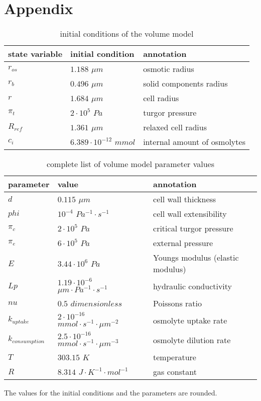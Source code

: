\section{Appendix}
\begin{table} [h]
	\footnotesize
	\begin{center} 
		\caption{initial conditions of the volume model}
		\begin{tabular} {l l l}
		\toprule
	 	\textbf{state variable} & \textbf{initial condition} & \textbf{annotation}  \\
	 	\midrule
	 	$r_{os}$ & $1.188$ $\mu m$ & osmotic radius\\
	 	$r_{b}$ & $0.496$ $\mu m$ &solid components radius\\
	 	$r$ & $1.684$ $\mu m$ & cell radius\\
	 	$\pi_t$ & $2 \cdot 10^5$ $Pa$ & turgor pressure\\
	 	$R_{ref}$ & $1.361$ $\mu m$ & relaxed cell radius \\
	 	$c_{i}$ & $6.389 \cdot 10^{-12}$ $mmol$ & internal amount of osmolytes\\
	 	\bottomrule
		\end{tabular}
		\label{initCondVolume}
	\end{center}
\end{table}

\begin{table} [h]
	\footnotesize
	\begin{center} 
		\caption{complete list of volume model parameter values}
		\begin{tabular} {l l l}
			\toprule
			\textbf{parameter} & \textbf{value} & \textbf{annotation}  \\
			\midrule
			$d$ & $0.115$ $\mu m$ & cell wall thickness\\
			$phi$ & $10^{-4}$ $Pa^{-1} \cdot s^{-1}$ & cell wall extensibility\\
			$\pi_c$ & $2 \cdot 10^5$ $Pa$ & critical turgor pressure\\
			$\pi_e$ & $6 \cdot 10^5$ $Pa$ & external pressure\\
			$E$ & $3.44 \cdot 10^6$ $Pa$ & Youngs modulus (elastic modulus)\\
			$Lp$ & $1.19 \cdot 10^{-6}$ $\mu m \cdot Pa^{-1} \cdot s^{-1}$ & hydraulic conductivity\\
			$nu$ & $0.5$ $dimensionless$ & Poissons ratio\\
			$k_{uptake}$ & $2 \cdot 10^{-16}$ $mmol \cdot s^{-1} \cdot \mu m ^{-2} $ & osmolyte uptake rate\\
			$k_{consumption}$ &$2.5 \cdot 10^{-16}$ $mmol \cdot s^{-1} \cdot \mu m ^{-3} $ & osmolyte dilution rate\\
			$T$ & $303.15$ $K$ & temperature\\
			$R$ & $8.314$ $J \cdot K^{-1} \cdot mol^{-1}$ & gas constant \\
			\bottomrule
		\end{tabular}
		\label{parameterVolume}
	\end{center}
\end{table}
The values for the initial conditions and the parameters are rounded.

